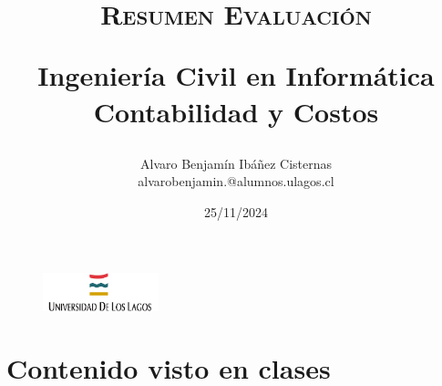 \documentclass[letter,12pt]{article}
\begin{document}
	\begin{figure}
		\includegraphics[width=0.3\textwidth, left]{figures/download.png}
	\end{figure}
	\setlength{\unitlength}{1 cm} 
	\title{\scshape\Huge{Resumen Evaluación}\\\vspace{0.5cm}
		
		\Large Ingeniería Civil en Informática\\\vspace{1cm}
		\Large Contabilidad y Costos\\\vspace{2cm}}
	
	\author{
		Alvaro Benjamín Ibáñez Cisternas\\
		alvarobenjamin.@alumnos.ulagos.cl
	\vspace{3cm}}
	
	\date{25/11/2024}
	\maketitle
	\thispagestyle{empty}
	\clearpage
	\setcounter{page}{1}
	
	\tableofcontents
	\newpage
	
	
	\section{Contenido visto en clases}
\end{document}
